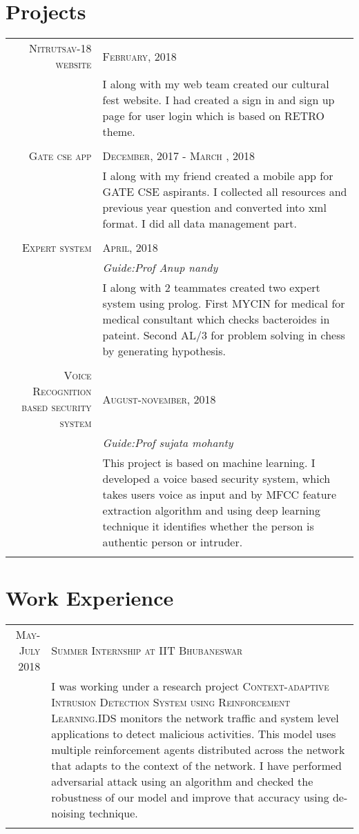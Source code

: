 \documentclass[a4paper,10pt]{article}
\begin{document}
\section{Projects}
\begin{tabular}{r|p{11cm}}
\textsc{Nitrutsav-18 website}&\textsc{February, 2018}\\ &\footnotesize{I along with my web team created our cultural fest website. I had created a sign in and sign up page for user login which is based on RETRO theme.}\\ \\

\textsc{Gate cse app}&\textsc{December, 2017 - March , 2018}\\ &\footnotesize{I along with my friend created a mobile app for GATE CSE aspirants. I collected all resources and previous year question and converted into xml format. I did all data management part.}\\ \\
\textsc{Expert system}&\textsc{April, 2018}\\
&\emph{Guide:Prof Anup nandy}\\
&\footnotesize{I along with 2 teammates created two expert system using prolog. First MYCIN for medical for medical consultant which checks bacteroides in pateint. Second AL/3 for problem solving in chess by generating hypothesis}.\\  \\
\textsc{Voice Recognition based security system}&\textsc{August-november, 2018}\\
&\emph{Guide:Prof sujata mohanty}\\
&\footnotesize{This project is based on machine learning. I developed a voice based security system, which takes users voice as input and by MFCC feature extraction algorithm and using deep learning technique it identifies whether the person is authentic person or intruder.}\\ 
\multicolumn{2}{c}{}
\end{tabular}

\section{Work Experience}
\begin{tabular}{r|p{11cm}}
\textsc{May-July 2018}&\textsc{Summer Internship at IIT Bhubaneswar}\\ &\footnotesize{I was working under a research project \textsc{Context-adaptive Intrusion Detection System using Reinforcement Learning}.IDS monitors the network traffic and system level applications to detect malicious activities. This model uses multiple reinforcement agents distributed across the network that adapts to the context of the network. I have performed adversarial attack using an algorithm and checked the robustness of our model and improve that accuracy using de-noising technique.}\\\multicolumn{2}{c}{}
\end{tabular}
\end{document}
